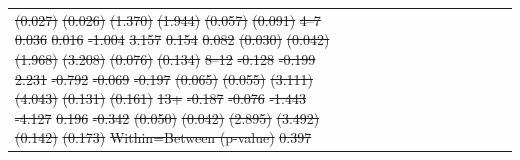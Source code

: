 \documentclass[12pt,english]{article}
\providecommand{\DIFdeltex}[1]{{\protect\color{red}\sout{#1}}}                      %
\providecommand{\DIFdelFL}[1]{\DIFdel{#1}} %
\providecommand{\DIFdel}[1]{\texorpdfstring{\DIFdeltex{#1}}{}} %
\begin{document}
\begin{table}[!ht]
\begin{center}
\begin{adjustbox}{max width=.9\linewidth}
\begin{threeparttable}
{\begin{tabular}{l*{6}{S S}}
\DIFdelFL{(0.027)         }%
\DIFdelFL{(0.026)         }%
\DIFdelFL{(1.370)         }%
\DIFdelFL{(1.944)         }%
\DIFdelFL{(0.057)         }%
\DIFdelFL{(0.091)         }%
\DIFdelFL{4--7}%
\DIFdelFL{0.036         }%
\DIFdelFL{0.016         }%
\DIFdelFL{-1.004         }%
\DIFdelFL{3.157         }%
\DIFdelFL{0.154}%
\DIFdelFL{0.082         }%
\DIFdelFL{(0.030)         }%
\DIFdelFL{(0.042)         }%
\DIFdelFL{(1.968)         }%
\DIFdelFL{(3.208)         }%
\DIFdelFL{(0.076)         }%
\DIFdelFL{(0.134)         }%
\DIFdelFL{8--12}%
\DIFdelFL{-0.128}%
\DIFdelFL{-0.199}%
\DIFdelFL{2.231         }%
\DIFdelFL{-0.792         }%
\DIFdelFL{-0.069         }%
\DIFdelFL{-0.197         }%
\DIFdelFL{(0.065)         }%
\DIFdelFL{(0.055)         }%
\DIFdelFL{(3.111)         }%
\DIFdelFL{(4.043)         }%
\DIFdelFL{(0.131)         }%
\DIFdelFL{(0.161)         }%
\DIFdelFL{13+}%
\DIFdelFL{-0.187}%
\DIFdelFL{-0.076}%
\DIFdelFL{-1.443         }%
\DIFdelFL{-4.127         }%
\DIFdelFL{0.196         }%
\DIFdelFL{-0.342}%
\DIFdelFL{(0.050)         }%
\DIFdelFL{(0.042)         }%
\DIFdelFL{(2.895)         }%
\DIFdelFL{(3.492)         }%
\DIFdelFL{(0.142)         }%
\DIFdelFL{(0.173)         }%
\DIFdelFL{Within=Between (p-value)}%
\DIFdelFL{0.397         }%

\end{tabular}}
\end{threeparttable}
\end{adjustbox}
\end{center}
\end{table}
\end{document}
